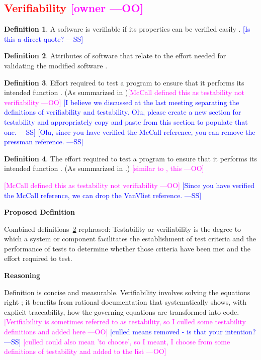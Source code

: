 \documentclass[letterpaper,cleveref]{lipics-v2019}
\newcommand{\authornote}[3]{\textcolor{#1}{[#3 ---#2]}}
\newcommand{\authornote}[3]{}
\newcommand{\wss}[1]{\authornote{blue}{SS}{#1}} %
\newcommand{\oo}[1]{\authornote{magenta}{OO}{#1}} %
\newcommand{\notdone}[1]{\textcolor{red}{#1}}
\theoremstyle{definition}
\newtheorem{defn}{Definition}
\begin{document}
\subsection{\notdone{Verifiability} \oo{owner}}

\begin{defn}
  A software is verifiable if its properties can be verified easily
  \citep{GhezziEtAl2003}.  \wss{Is this a direct quote?}
\end{defn}

\begin{defn} \label{Defn_Verifiability1}
  Attributes of software that relate to the effort needed for validating the
  modified software \citep{iso2001iec}.
\end{defn}

\begin{defn}
  Effort required to test a program to ensure that it performs its intended
  function \citep{McCallEtAl1977}. (As summarized in
  \citet{pressman2005software})\oo{McCall defined this as testability not
    verifiability}  \wss{I believe we discussed at the last meeting separating
    the definitions of verifiability and testability.  Olu, please create a new
    section for testability and appropriately copy and paste from this section to
    populate that one.} \wss{Olu, since you have verified the McCall reference,
    you can remove the pressman reference.}
\end{defn}

\begin{defn}
	The effort required to test a program to ensure that it performs its
	intended function \citep{McCallEtAl1977}. (As summarized in
	\citet{VanVliet2000}.) \oo{similar to \citep{pressman2005software}, this}
\end{defn} \oo{McCall defined this as testability not verifiability}  \wss{Since
  you have verified the McCall reference, we can drop the VanVliet reference.}

\noindent \textbf{Proposed Definition}

Combined definitions~\ref{Defn_Verifiability1}
rephrased: Testability or verifiability is the degree to which a system or
component facilitates the establishment of test criteria and the performance of
tests to determine whether those criteria have been met and the effort required
to test.

\noindent \textbf{Reasoning} 

Definition is concise and measurable.  Verifiability involves solving the
equations right \citep[p.~23]{Roache1998}; it benefits from rational
documentation that systematically shows, with explicit traceability, how the
governing equations are transformed into code.  \oo{Verifiability is sometimes
  referred to as testability, so I culled some testability definitions and added
  here} \wss{culled means removed - is that your intention?} \oo{culled could
  also mean 'to choose', so I meant, I choose from some definitions of
  testability and added to the list}
\end{document}
